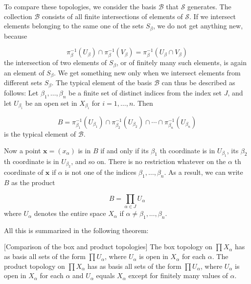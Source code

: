 To compare these topologies, we consider the basis \(\mathcal{B}\) that \(\mathcal{S}\) generates. The collection \(\mathcal{B}\) consists of all finite intersections of elements of \(\mathcal{S}\). If we intersect elements belonging to the same one of the sets \(S_{\beta }\), we do not get anything new, because

\[
{\pi }_{\beta }^{-1}( U_{\beta }) \cap {\pi }_{\beta }^{-1}( V_{\beta }) = {\pi }_{\beta }^{-1}( {U_{\beta } \cap {V}_{\beta }})
\]
the intersection of two elements of \(S_{\beta }\), or of finitely many such elements, is again an element of \(S_{\beta }\). We get something new only when we intersect elements from different sets \(S_{\beta }\). The typical element of the basis \(\mathcal{B}\) can thus be described as follows: Let \({\beta }_{1},\ldots,{\beta }_{n}\) be a finite set of distinct indices from the index set \(J\), and let \(U_{{\beta }_{i}}\) be an open set in \(X_{{\beta }_{i}}\) for \(i = 1,\ldots,n\). Then

\[
B = {\pi }_{{\beta }_{1}}^{-1}( U_{{\beta }_{1}}) \cap {\pi }_{{\beta }_{2}}^{-1}( U_{{\beta }_{2}}) \cap \cdots \cap {\pi }_{{\beta }_{n}}^{-1}( U_{{\beta }_{n}})
\]
is the typical element of \(\mathcal{B}\).

Now a point \(\mathbf{x} = ( x_{\alpha })\) is in \(B\) if and only if its \({\beta }_{1}\) th coordinate is in \(U_{{\beta }_{1}}\), its \({\beta }_{2}\) th coordinate is in \(U_{{\beta }_{2}}\), and so on. There is no restriction whatever on the \(\alpha\) th coordinate of \(\mathbf{x}\) if \(\alpha\) is not one of the indices \({\beta }_{1},\ldots,{\beta }_{n}\). As a result, we can write \(B\) as the product

\[
B = \mathop{\prod }\limits_{{\alpha \in J}}U_{\alpha }
\]
where \(U_{\alpha }\) denotes the entire space \(X_{\alpha }\) if \(\alpha \neq {\beta }_{1},\ldots,{\beta }_{n}\).

All this is summarized in the following theorem:

\begin{theorem}
\label{thm:\thetheorem}[Comparison of the box and product topologies]
 The box topology on \(\prod {X}_{\alpha }\) has as basis all sets of the form \(\prod {U}_{\alpha }\), where \(U_{\alpha }\) is open in \(X_{\alpha }\) for each \(\alpha\). The product topology on \(\prod {X}_{\alpha }\) has as basis all sets of the form \(\prod {U}_{\alpha }\), where \(U_{\alpha }\) is open in \(X_{\alpha }\) for each \(\alpha\) and \(U_{\alpha }\) equals \(X_{\alpha }\) except for finitely many values of \(\alpha\).
\end{theorem}

